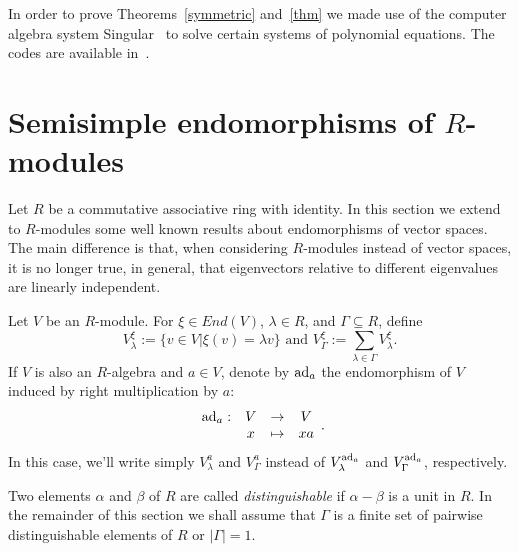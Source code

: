 \documentclass[a4paper]{amsart}
\newcommand{\ad}{{\rm ad}}
\begin{document}
In order to prove Theorems~\ref{symmetric} and~\ref{thm} we made use of the computer algebra system Singular~\cite{Singular} to solve certain systems of polynomial equations. The codes are available in~\cite{code}. 
\section{Semisimple endomorphisms of $R$-modules} \label{nuovasec}
Let  $R$ be a commutative associative ring with identity. In this section we extend to $R$-modules some well known results about endomorphisms of vector spaces. The main difference is that,  when considering $R$-modules instead of vector spaces, it is no longer true, in general, that eigenvectors relative to different eigenvalues are linearly independent.

Let $V$ be an $R$-module.  For $\xi\in End(V)$, $\lambda \in R$, and $\Gamma \subseteq R$, define 
$$V_\lambda^\xi:=\{v\in V| \xi(v)=\lambda v\} \mbox{ and } V_{\Gamma}^\xi:=\sum_{\lambda\in \Gamma}V_\lambda^\xi.$$
If $V$ is also an $R$-algebra and $a\in V$,  denote by $\ad_a$ the endomorphism of $V$ induced by right multiplication by $a$: 
$$\begin{array}{rccc}
\ad_a:& V&\to &V\\
& x&\mapsto& xa
\end{array}.
$$
In this case, we'll write simply $V_\lambda^a$ and $V_\Gamma^a$ instead of $V_\lambda^{\ad_a}$ and $V_\Gamma^{\ad_a}$, respectively.

Two elements $\alpha$ and $\beta$ of $R$ are called \textit{distinguishable}  if $\alpha-\beta$ is a unit in $R$. In the remainder of this section we shall  assume that $\Gamma$ is a finite set of pairwise distinguishable elements of $R$ or $|\Gamma|=1$. 
\end{document}
